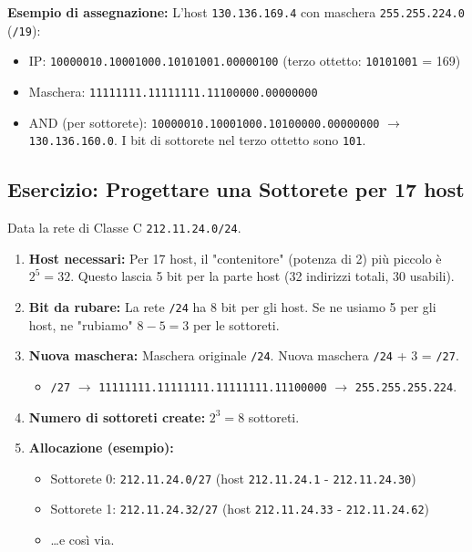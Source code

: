 \textbf{Esempio di assegnazione:} L'host \texttt{130.136.169.4} con maschera \texttt{255.255.224.0} (\texttt{/19}):
\begin{itemize}
    \item IP: \texttt{10000010.10001000.10101001.00000100} (terzo ottetto: \texttt{10101001} = 169)
    \item Maschera: \texttt{11111111.11111111.11100000.00000000}
    \item AND (per sottorete): \texttt{10000010.10001000.10100000.00000000} $\rightarrow$ \texttt{130.136.160.0}.
    I bit di sottorete nel terzo ottetto sono \texttt{101}.
\end{itemize}


\subsection{Esercizio: Progettare una Sottorete per 17 host}
Data la rete di Classe C \texttt{212.11.24.0/24}.
\begin{enumerate}
    \item \textbf{Host necessari:} Per 17 host, il "contenitore" (potenza di 2) più piccolo è $2^5 = 32$. Questo lascia 5 bit per la parte host (32 indirizzi totali, 30 usabili).
    \item \textbf{Bit da rubare:} La rete \texttt{/24} ha 8 bit per gli host. Se ne usiamo 5 per gli host, ne "rubiamo" $8 - 5 = 3$ per le sottoreti.
    \item \textbf{Nuova maschera:} Maschera originale \texttt{/24}. Nuova maschera \texttt{/24} + 3 = \texttt{/27}.
    \begin{itemize}
        \item \texttt{/27} $\rightarrow$ \texttt{11111111.11111111.11111111.11100000} $\rightarrow$ \texttt{255.255.255.224}.
    \end{itemize}
    \item \textbf{Numero di sottoreti create:} $2^3 = 8$ sottoreti.
    \item \textbf{Allocazione (esempio):}
    \begin{itemize}
        \item Sottorete 0: \texttt{212.11.24.0/27} (host \texttt{212.11.24.1} - \texttt{212.11.24.30})
        \item Sottorete 1: \texttt{212.11.24.32/27} (host \texttt{212.11.24.33} - \texttt{212.11.24.62})
        \item \dots e così via.
    \end{itemize}
\end{enumerate}

